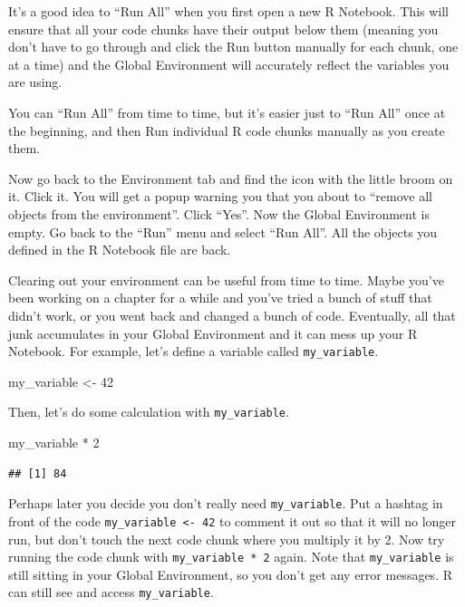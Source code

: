 \documentclass[
]{book}
\newenvironment{Shaded}{\begin{snugshade}}{\end{snugshade}}
\newcommand{\DecValTok}[1]{\textcolor[rgb]{0.00,0.00,0.81}{#1}}
\newcommand{\NormalTok}[1]{#1}
\newcommand{\OtherTok}[1]{\textcolor[rgb]{0.56,0.35,0.01}{#1}}
\newcommand{\SpecialCharTok}[1]{\textcolor[rgb]{0.00,0.00,0.00}{#1}}
\begin{document}
It's a good idea to ``Run All'' when you first open a new R Notebook. This will ensure that all your code chunks have their output below them (meaning you don't have to go through and click the Run button manually for each chunk, one at a time) and the Global Environment will accurately reflect the variables you are using.

You can ``Run All'' from time to time, but it's easier just to ``Run All'' once at the beginning, and then Run individual R code chunks manually as you create them.

Now go back to the Environment tab and find the icon with the little broom on it. Click it. You will get a popup warning you that you about to ``remove all objects from the environment''. Click ``Yes''. Now the Global Environment is empty. Go back to the ``Run'' menu and select ``Run All''. All the objects you defined in the R Notebook file are back.

Clearing out your environment can be useful from time to time. Maybe you've been working on a chapter for a while and you've tried a bunch of stuff that didn't work, or you went back and changed a bunch of code. Eventually, all that junk accumulates in your Global Environment and it can mess up your R Notebook. For example, let's define a variable called \texttt{my\_variable}.

\begin{Shaded}
\begin{Highlighting}[]
\NormalTok{my\_variable }\OtherTok{\textless{}{-}} \DecValTok{42}
\end{Highlighting}
\end{Shaded}

Then, let's do some calculation with \texttt{my\_variable}.

\begin{Shaded}
\begin{Highlighting}[]
\NormalTok{my\_variable }\SpecialCharTok{*} \DecValTok{2}
\end{Highlighting}
\end{Shaded}

\begin{verbatim}
## [1] 84
\end{verbatim}

Perhaps later you decide you don't really need \texttt{my\_variable}. Put a hashtag in front of the code \texttt{my\_variable\ \textless{}-\ 42} to comment it out so that it will no longer run, but don't touch the next code chunk where you multiply it by 2. Now try running the code chunk with \texttt{my\_variable\ *\ 2} again. Note that \texttt{my\_variable} is still sitting in your Global Environment, so you don't get any error messages. R can still see and access \texttt{my\_variable}.
\end{document}
